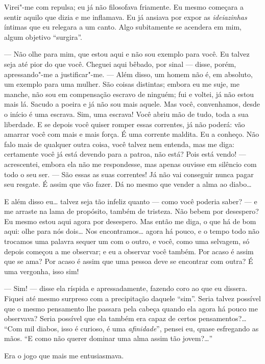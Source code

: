 Virei"-me com repulsa; eu já não filosofava friamente. Eu mesmo começara
a sentir aquilo que dizia e me inflamava. Eu já ansiava por expor as
\textit{ideiazinhas} íntimas que eu relegara a um canto. Algo
subitamente se acendera em mim, algum objetivo “surgira”.

--- Não olhe para mim, que estou aqui e não sou exemplo para você. Eu
talvez seja até pior do que você. Cheguei aqui bêbado, por sinal ---
disse, porém, apressando"-me a justificar"-me. --- Além disso, um homem
não é, em absoluto, um exemplo para uma mulher. São coisas distintas;
embora eu me suje, me manche, não sou em compensação escravo de
ninguém; fui e voltei, já não estou mais lá. Sacudo a poeira e já não
sou mais aquele. Mas você, convenhamos, desde o início é uma escrava.
Sim, uma escrava! Você abriu mão de tudo, toda a sua liberdade. E se
depois você quiser romper essas correntes, já não poderá: vão amarrar
você com mais e mais força. É uma corrente maldita. Eu a conheço. Não
falo mais de qualquer outra coisa, você talvez nem entenda, mas me
diga: certamente você já está devendo para a patroa, não está? Pois
está vendo! --- acrescentei, embora ela não me respondesse, mas apenas
ouvisse em silêncio com todo o seu ser. --- São essas as suas correntes!
Já não vai conseguir nunca pagar seu resgate. É assim que vão fazer. Dá
no mesmo que vender a alma ao diabo\ldots{}

E além disso eu\ldots{} talvez seja tão infeliz quanto --- como você poderia
saber? --- e me arraste na lama de propósito, também de tristeza. Não
bebem por desespero? Eu mesmo estou aqui agora por desespero. Mas então
me diga, o que há de bom aqui: olhe para nós dois\ldots{} Nos encontramos\ldots{}
agora há pouco, e o tempo todo não trocamos uma palavra sequer um com o
outro, e você, como uma selvagem, só depois começou a me observar; e eu
a observar você também. Por acaso é assim que se ama? Por acaso é assim
que uma pessoa deve se encontrar com outra? É uma vergonha, isso sim!

--- Sim! --- disse ela ríspida e apressadamente, fazendo coro ao que eu
dissera. Fiquei até mesmo surpreso com a precipitação daquele “sim”.
Seria talvez possível que o mesmo pensamento lhe passara pela cabeça
quando ela agora há pouco me observava? Seria possível que ela também
era capaz de certos pensamentos?\ldots{} “Com mil diabos, isso é curioso, é
uma \textit{afinidade}”, pensei eu, quase esfregando as mãos. “E como
não querer dominar uma alma assim tão jovem?\ldots{}”

Era o jogo que mais me entusiasmava.

